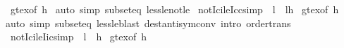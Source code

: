 \begin{isabellebody}
%
\isadelimproof
%
\endisadelimproof
%
\isatagproof
{}\isamarkupfalse%
\ gt{\isacharunderscore}{\kern0pt}ex{\isacharbrackleft}{\kern0pt}of\ h{\isacharbrackright}{\kern0pt}\ \isamarkupfalse%
{\isacharparenleft}{\kern0pt}auto\ simp{\isacharcolon}{\kern0pt}\ subset{\isacharunderscore}{\kern0pt}eq\ less{\isacharunderscore}{\kern0pt}le{\isacharunderscore}{\kern0pt}not{\isacharunderscore}{\kern0pt}le{\isacharparenright}{\kern0pt}%
\endisatagproof
{\isafoldproof}%
%
\isadelimproof
\isanewline
%
\endisadelimproof
\isanewline
{}\isamarkupfalse%
\ not{\isacharunderscore}{\kern0pt}Ici{\isacharunderscore}{\kern0pt}le{\isacharunderscore}{\kern0pt}Icc{\isacharbrackleft}{\kern0pt}simp{\isacharbrackright}{\kern0pt}{\isacharcolon}{\kern0pt}\ {\isachardoublequoteopen}{\isasymnot}\ {\isacharbraceleft}{\kern0pt}l{\isachardot}{\kern0pt}{\isachardot}{\kern0pt}{\isacharbraceright}{\kern0pt}\ {\isasymsubseteq}\ {\isacharbraceleft}{\kern0pt}l{\isacharprime}{\kern0pt}{\isachardot}{\kern0pt}{\isachardot}{\kern0pt}h{\isacharprime}{\kern0pt}{\isacharbraceright}{\kern0pt}{\isachardoublequoteclose}\isanewline
%
\isadelimproof
%
\endisadelimproof
%
\isatagproof
{}\isamarkupfalse%
\ gt{\isacharunderscore}{\kern0pt}ex{\isacharbrackleft}{\kern0pt}of\ h{\isacharprime}{\kern0pt}{\isacharbrackright}{\kern0pt}\isanewline
{}\isamarkupfalse%
{\isacharparenleft}{\kern0pt}auto\ simp{\isacharcolon}{\kern0pt}\ subset{\isacharunderscore}{\kern0pt}eq\ less{\isacharunderscore}{\kern0pt}le{\isacharparenright}{\kern0pt}{\isacharparenleft}{\kern0pt}blast\ dest{\isacharcolon}{\kern0pt}antisym{\isacharunderscore}{\kern0pt}conv\ intro{\isacharcolon}{\kern0pt}\ order{\isacharunderscore}{\kern0pt}trans{\isacharparenright}{\kern0pt}%
\endisatagproof
{\isafoldproof}%
%
\isadelimproof
\isanewline
%
\endisadelimproof
\isanewline
{}\isamarkupfalse%
\ not{\isacharunderscore}{\kern0pt}Ici{\isacharunderscore}{\kern0pt}le{\isacharunderscore}{\kern0pt}Iic{\isacharbrackleft}{\kern0pt}simp{\isacharbrackright}{\kern0pt}{\isacharcolon}{\kern0pt}\ {\isachardoublequoteopen}{\isasymnot}\ {\isacharbraceleft}{\kern0pt}l{\isachardot}{\kern0pt}{\isachardot}{\kern0pt}{\isacharbraceright}{\kern0pt}\ {\isasymsubseteq}\ {\isacharbraceleft}{\kern0pt}{\isachardot}{\kern0pt}{\isachardot}{\kern0pt}h{\isacharprime}{\kern0pt}{\isacharbraceright}{\kern0pt}{\isachardoublequoteclose}\isanewline
%
\isadelimproof
%
\endisadelimproof
%
\isatagproof
{}\isamarkupfalse%
\ gt{\isacharunderscore}{\kern0pt}ex{\isacharbrackleft}{\kern0pt}of\ h{\isacharprime}{\kern0pt}{\isacharbrackright}{\kern0pt}\isanewline

\end{isabellebody}
